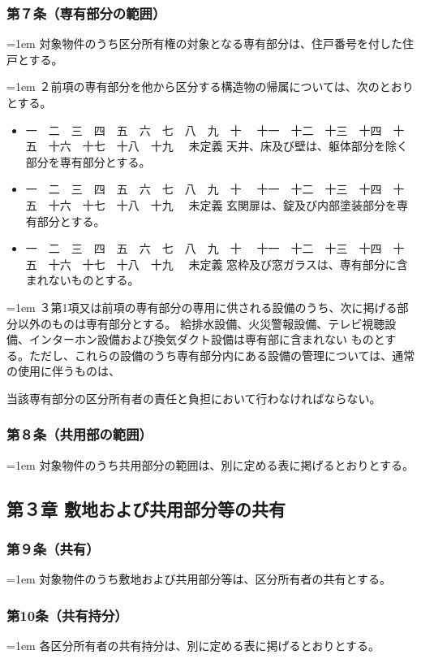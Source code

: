 \documentclass[
  twoside,
  luatex,
  paper=a4paper,
  fontsize=11pt,
  jafontsize=11pt,
  jlreq_notes,
]{jlreq}
\newcommand{\joumain}[1]{%
  \noindent\hangindent=1em\hangafter=1
  \hspace{1em}#1%
}
\newcommand{\kou}[2]{%
  \par\noindent\hangindent=1em\hangafter=1
  #1\hspace{1em}#2%
}
\def\toKansuji#1{
  \tempvls=#1
  \ifcase\tempvls
    \or 一　\or 二　\or 三　\or 四　\or 五　\or 六　\or 七　\or 八　\or 九　\or 十　
    \or 十一　\or 十二　\or 十三　\or 十四　\or 十五　\or 十六　\or 十七　\or 十八　\or 十九　
  \else 未定義
  \fi
}
\begin{document}
  \subsubsection*{ 第７条（専有部分の範囲）}
  \joumain{対象物件のうち区分所有権の対象となる専有部分は、住戸番号を付した住戸とする。}
  \kou{２}{前項の専有部分を他から区分する構造物の帰属については、次のとおりとする。}
  \begin{itemize}[label={}, leftmargin=3em, itemindent=-2em]
    \item \toKansuji{1}天井、床及び壁は、躯体部分を除く部分を専有部分とする。
    \item \toKansuji{2}玄関扉は、錠及び内部塗装部分を専有部分とする。
    \item \toKansuji{3}窓枠及び窓ガラスは、専有部分に含まれないものとする。 
  \end{itemize}
  \kou{３}{第1項又は前項の専有部分の専用に供される設備のうち、次に掲げる部分以外のものは専有部分とする。
  給排水設備、火災警報設備、テレビ視聴設備、インターホン設備および換気ダクト設備は専有部に含まれない
  ものとする。ただし、これらの設備のうち専有部分内にある設備の管理については、通常の使用に伴うものは、}
  当該専有部分の区分所有者の責任と負担において行わなければならない。

  \subsubsection*{第８条（共用部の範囲）}
  \joumain{対象物件のうち共用部分の範囲は、別に定める表に掲げるとおりとする。}
  
  \begin{center}
    \subsection*{第３章 敷地および共用部分等の共有}
  \end{center}

  \subsubsection*{第９条（共有）}
  \joumain{対象物件のうち敷地および共用部分等は、区分所有者の共有とする。}

  \subsubsection*{第10条（共有持分）}
  \joumain{各区分所有者の共有持分は、別に定める表に掲げるとおりとする。}
\end{document}
